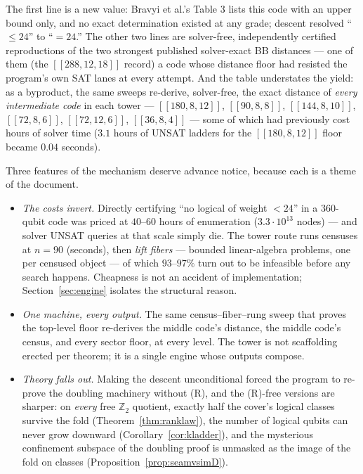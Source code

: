 \documentclass[11pt]{article}
\theoremstyle{plain}
\theoremstyle{definition}
\theoremstyle{remark}
\newcommand{\Z}{\mathbb{Z}}
\begin{document}
The first line is a new value: Bravyi et al.'s Table 3 lists this code
with an upper bound only, and no exact determination existed at any grade;
descent resolved ``$\leq 24$'' to ``$= 24$.'' The other two lines are
solver-free, independently certified reproductions of the two strongest
published solver-exact BB distances --- one of them (the $[[288,12,18]]$
record) a code whose distance floor had resisted the program's own SAT
lanes at every attempt. And the table understates the yield: as a
byproduct, the same sweeps re-derive, solver-free, the exact distance of
\emph{every intermediate code} in each tower --- $[[180,8,12]]$,
$[[90,8,8]]$, $[[144,8,10]]$, $[[72,8,6]]$, $[[72,12,6]]$, $[[36,8,4]]$
--- some of which had previously cost hours of solver time
($3.1$ hours of UNSAT ladders for the $[[180,8,12]]$ floor became $0.04$
seconds).

Three features of the mechanism deserve advance notice, because each is a
theme of the document.

\begin{itemize}[leftmargin=2em]
\item \emph{The costs invert.} Directly certifying ``no logical of weight
  $< 24$'' in a $360$-qubit code was priced at $40$--$60$ hours of
  enumeration ($3.3 \cdot 10^{13}$ nodes) --- and solver UNSAT queries at
  that scale simply die. The tower route runs censuses at $n = 90$
  (seconds), then \emph{lift fibers} --- bounded linear-algebra problems,
  one per censused object --- of which $93$--$97\%$ turn out to be
  infeasible before any search happens. Cheapness is not an accident of
  implementation; Section~\ref{sec:engine} isolates the structural reason.
\item \emph{One machine, every output.} The same census--fiber--rung sweep
  that proves the top-level floor re-derives the middle code's distance,
  the middle code's census, and every sector floor, at every level. The
  tower is not scaffolding erected per theorem; it is a single engine
  whose outputs compose.
\item \emph{Theory falls out.} Making the descent unconditional forced the
  program to re-prove the doubling machinery without (R), and the
  (R)-free versions are sharper: on \emph{every} free $\Z_2$ quotient,
  exactly half the cover's logical classes survive the fold
  (Theorem~\ref{thm:ranklaw}), the number of logical qubits can never grow
  downward (Corollary~\ref{cor:kladder}), and the mysterious confinement
  subspace of the doubling proof is unmasked as the image of the fold on
  classes (Proposition~\ref{prop:seamvsimD}).
\end{itemize}
\end{document}
